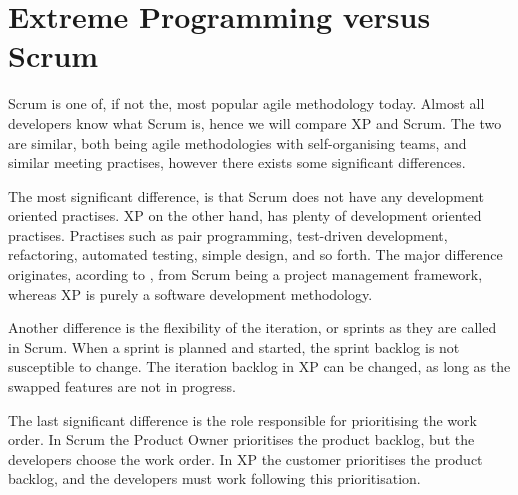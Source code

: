\section{Extreme Programming versus Scrum}
Scrum is one of, if not the, most popular agile methodology today.
Almost all developers know what Scrum is, hence we will compare XP and Scrum.
The two are similar, both being agile methodologies with self-organising teams, and similar meeting practises, however there exists some significant differences.

The most significant difference, is that Scrum does not have any development oriented practises.
XP on the other hand, has plenty of development oriented practises. Practises such as pair programming, test-driven development, refactoring, automated testing, simple design, and so forth.
The major difference originates, acording to \citet{xp:scrum}, from Scrum being a project management framework, whereas XP is purely a software development methodology.

Another difference is the flexibility of the iteration, or sprints as they are called in Scrum.
When a sprint is planned and started, the sprint backlog is not susceptible to change.
The iteration backlog in XP can be changed, as long as the swapped features are not in progress.

The last significant difference is the role responsible for prioritising the work order.
In Scrum the Product Owner prioritises the product backlog, but the developers choose the work order.
In XP the customer prioritises the product backlog, and the developers must work following this prioritisation. 